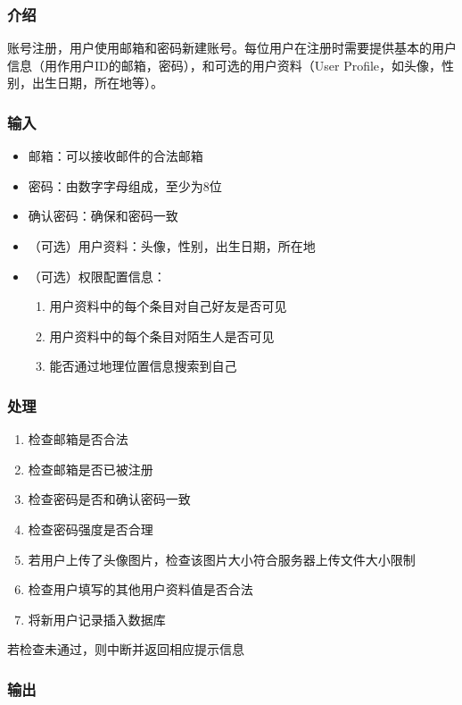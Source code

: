\subsubsection{介绍}

账号注册，用户使用邮箱和密码新建账号。每位用户在注册时需要提供基本的用户信息（用作用户ID的邮箱，密码），和可选的用户资料（User Profile，如头像，性别，出生日期，所在地等）。

\subsubsection{输入}

\begin{itemize}
	\item 邮箱：可以接收邮件的合法邮箱
	\item 密码：由数字字母组成，至少为8位
	\item 确认密码：确保和密码一致
	\item （可选）用户资料：头像，性别，出生日期，所在地
	\item （可选）权限配置信息：
		\begin{enumerate}	
		\item 用户资料中的每个条目对自己好友是否可见
		\item 用户资料中的每个条目对陌生人是否可见
		\item 能否通过地理位置信息搜索到自己
		\end{enumerate}
	\end{itemize}
\subsubsection{处理}

\begin{enumerate}
	\item 检查邮箱是否合法
	\item 检查邮箱是否已被注册
	\item 检查密码是否和确认密码一致
	\item 检查密码强度是否合理
	\item 若用户上传了头像图片，检查该图片大小符合服务器上传文件大小限制
	\item 检查用户填写的其他用户资料值是否合法
	\item 将新用户记录插入数据库
	\end{enumerate}
若检查未通过，则中断并返回相应提示信息

\subsubsection{输出}

